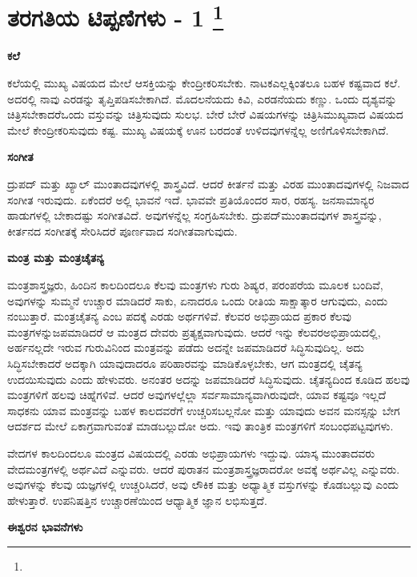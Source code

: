 
\chapter[ತರಗತಿಯ ಟಿಪ್ಪಣಿಗಳು - 1 ]{ತರಗತಿಯ ಟಿಪ್ಪಣಿಗಳು - 1 \protect\footnote{}}

\centerline{\textbf{ಕಲೆ}}

ಕಲೆಯಲ್ಲಿ ಮುಖ್ಯ ವಿಷಯದ ಮೇಲೆ ಆಸಕ್ತಿಯನ್ನು ಕೇಂದ್ರೀಕರಿಸಬೇಕು. ನಾಟಕ\break ಎಲ್ಲಕ್ಕಿಂತಲೂ ಬಹಳ ಕಷ್ಟವಾದ ಕಲೆ. ಅದರಲ್ಲಿ ನಾವು ಎರಡನ್ನು ತೃಪ್ತಿಪಡಿಸಬೇಕಾಗಿದೆ. ಮೊದಲನೆಯದು ಕಿವಿ, ಎರಡನೆಯದು ಕಣ್ಣು. ಒಂದು ದೃಶ್ಯವನ್ನು ಚಿತ್ರಿಸಬೇಕಾದರೆ\break ಒಂದು ವಸ್ತುವನ್ನು ಚಿತ್ರಿಸುವುದು ಸುಲಭ. ಬೇರೆ ಬೇರೆ ವಿಷಯಗಳನ್ನು ಚಿತ್ರಿಸಿ\break ಮುಖ್ಯವಾದ ವಿಷಯದ ಮೇಲೆ ಕೇಂದ್ರೀಕರಿಸುವುದು ಕಷ್ಟ. ಮುಖ್ಯ ವಿಷಯಕ್ಕೆ ಊನ ಬರದಂತೆ ಉಳಿದವುಗಳನ್ನೆಲ್ಲ ಅಣಿಗೊಳಿಸಬೇಕಾಗಿದೆ.

\centerline{\textbf{ಸಂಗೀತ}}

ದ್ರುಪದ್​ ಮತ್ತು ಖ್ಯಾಲ್​ ಮುಂತಾದವುಗಳಲ್ಲಿ ಶಾಸ್ತ್ರವಿದೆ. ಆದರೆ ಕೀರ್ತನೆ ಮತ್ತು ವಿರಹ ಮುಂತಾದವುಗಳಲ್ಲಿ ನಿಜವಾದ ಸಂಗೀತ ಇರುವುದು. ಏಕೆಂದರೆ ಅಲ್ಲಿ ಭಾವನೆ ಇದೆ. ಭಾವವೇ ಪ್ರತಿಯೊಂದರ ಸಾರ, ರಹಸ್ಯ. ಜನಸಾಮಾನ್ಯರ ಹಾಡುಗಳಲ್ಲಿ ಬೇಕಾದಷ್ಟು ಸಂಗೀತವಿದೆ. ಅವುಗಳನ್ನೆಲ್ಲ ಸಂಗ್ರಹಿಸಬೇಕು. ದ್ರುಪದ್​ ಮುಂತಾದವುಗಳ ಶಾಸ್ತ್ರವನ್ನು, ಕೀರ್ತನದ ಸಂಗೀತಕ್ಕೆ ಸೇರಿಸಿದರೆ ಪೂರ್ಣವಾದ ಸಂಗೀತವಾಗುವುದು.

\centerline{\textbf{ಮಂತ್ರ ಮತ್ತು ಮಂತ್ರಚೈತನ್ಯ}}

ಮಂತ್ರಶಾಸ್ತ್ರಜ್ಞರು, ಹಿಂದಿನ ಕಾಲದಿಂದಲೂ ಕೆಲವು ಮಂತ್ರಗಳು ಗುರು ಶಿಷ್ಯರ, ಪರಂಪರೆಯ ಮೂಲಕ ಬಂದಿವೆ, ಅವುಗಳನ್ನು ಸುಮ್ಮನೆ ಉಚ್ಚಾರ ಮಾಡಿದರೆ ಸಾಕು, ಏನಾದರೂ ಒಂದು ರೀತಿಯ ಸಾಕ್ಷಾತ್ಕಾರ ಆಗುವುದು, ಎಂದು ನಂಬುತ್ತಾರೆ. ಮಂತ್ರಚೈತನ್ಯ ಎಂಬ ಪದಕ್ಕೆ ಎರಡು ಅರ್ಥಗಳಿವೆ. ಕೆಲವರ ಅಭಿಪ್ರಾಯದ ಪ್ರಕಾರ ಕೆಲವು ಮಂತ್ರಗಳನ್ನು\break ಜಪಮಾಡಿದರೆ ಆ ಮಂತ್ರದ ದೇವರು ಪ್ರತ್ಯಕ್ಷವಾಗುವುದು. ಆದರೆ ಇನ್ನು ಕೆಲವರ\break ಅಭಿಪ್ರಾಯದಲ್ಲಿ, ಅರ್ಹನಲ್ಲದೇ ಇರುವ ಗುರುವಿನಿಂದ ಮಂತ್ರವನ್ನು ಪಡೆದು ಅದನ್ನೇ ಜಪಮಾಡಿದರೆ ಸಿದ್ಧಿಸುವುದಿಲ್ಲ. ಅದು ಸಿದ್ಧಿಸಬೇಕಾದರೆ ಅದಕ್ಕಾಗಿ ಯಾವುದಾದರೂ ಪರಿಹಾರವನ್ನು ಮಾಡಿಕೊಳ್ಳಬೇಕು, ಆಗ ಮಂತ್ರದಲ್ಲಿ ಚೈತನ್ಯ ಉದಯಿಸುವುದು ಎಂದು ಹೇಳುವರು. ಅನಂತರ ಅದನ್ನು ಜಪಮಾಡಿದರೆ ಸಿದ್ಧಿಸುವುದು. ಚೈತನ್ಯದಿಂದ ಕೂಡಿದ ಹಲವು ಮಂತ್ರಗಳಿಗೆ ಹಲವು ಚಿಹ್ನೆಗಳಿವೆ. ಆದರೆ ಅವುಗಳಲ್ಲೆಲ್ಲಾ ಸರ್ವಸಾಮಾನ್ಯವಾಗಿರುವುದೇ, ಯಾವ ಕಷ್ಟವೂ ಇಲ್ಲದೆ ಸಾಧಕನು ಯಾವ ಮಂತ್ರವನ್ನು ಬಹಳ ಕಾಲದವರೆಗೆ ಉಚ್ಚರಿಸಬಲ್ಲನೋ ಮತ್ತು ಯಾವುದು ಅವನ ಮನಸ್ಸನ್ನು ಬೇಗ ಆದರ್ಶದ ಮೇಲೆ ಏಕಾಗ್ರವಾಗುವಂತೆ ಮಾಡಬಲ್ಲುದೋ ಅದು. ಇವು ತಾಂತ್ರಿಕ ಮಂತ್ರಗಳಿಗೆ ಸಂಬಂಧಪಟ್ಟವುಗಳು.

ವೇದಗಳ ಕಾಲದಿಂದಲೂ ಮಂತ್ರದ ವಿಷಯದಲ್ಲಿ ಎರಡು ಅಭಿಪ್ರಾಯಗಳು ಇದ್ದುವು. ಯಾಸ್ಕ ಮುಂತಾದವರು ವೇದಮಂತ್ರಗಳಲ್ಲಿ ಅರ್ಥವಿದೆ ಎನ್ನುವರು. ಆದರೆ ಪುರಾತನ ಮಂತ್ರಶಾಸ್ತ್ರಜ್ಞರಾದರೋ ಅವಕ್ಕೆ ಅರ್ಥವಿಲ್ಲ ಎನ್ನುವರು. ಅವುಗಳನ್ನು ಕೆಲವು ಯಜ್ಞಗಳಲ್ಲಿ ಉಚ್ಚರಿಸಿದರೆ, ಅವು ಲೌಕಿಕ ಮತ್ತು ಅಧ್ಯಾತ್ಮಿಕ ವಸ್ತುಗಳನ್ನು ಕೊಡಬಲ್ಲುವು ಎಂದು ಹೇಳುತ್ತಾರೆ. ಉಪನಿಷತ್ತಿನ ಉಚ್ಚಾರಣೆಯಿಂದ ಆಧ್ಯಾತ್ಮಿಕ ಜ್ಞಾನ ಲಭಿಸುತ್ತದೆ.

\centerline{\textbf{ಈಶ್ವರನ ಭಾವನೆಗಳು}}

